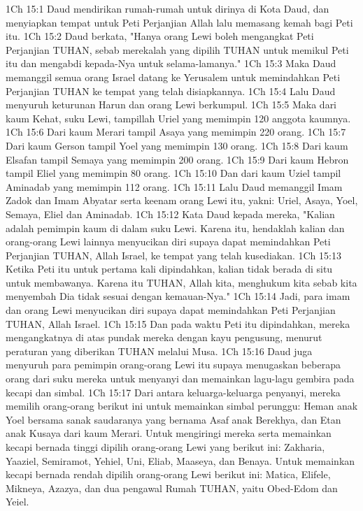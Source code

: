 1Ch 15:1  Daud mendirikan rumah-rumah untuk dirinya di Kota Daud, dan menyiapkan tempat untuk Peti Perjanjian Allah lalu memasang kemah bagi Peti itu.
1Ch 15:2  Daud berkata, "Hanya orang Lewi boleh mengangkat Peti Perjanjian TUHAN, sebab merekalah yang dipilih TUHAN untuk memikul Peti itu dan mengabdi kepada-Nya untuk selama-lamanya."
1Ch 15:3  Maka Daud memanggil semua orang Israel datang ke Yerusalem untuk memindahkan Peti Perjanjian TUHAN ke tempat yang telah disiapkannya.
1Ch 15:4  Lalu Daud menyuruh keturunan Harun dan orang Lewi berkumpul.
1Ch 15:5  Maka dari kaum Kehat, suku Lewi, tampillah Uriel yang memimpin 120 anggota kaumnya.
1Ch 15:6  Dari kaum Merari tampil Asaya yang memimpin 220 orang.
1Ch 15:7  Dari kaum Gerson tampil Yoel yang memimpin 130 orang.
1Ch 15:8  Dari kaum Elsafan tampil Semaya yang memimpin 200 orang.
1Ch 15:9  Dari kaum Hebron tampil Eliel yang memimpin 80 orang.
1Ch 15:10  Dan dari kaum Uziel tampil Aminadab yang memimpin 112 orang.
1Ch 15:11  Lalu Daud memanggil Imam Zadok dan Imam Abyatar serta keenam orang Lewi itu, yakni: Uriel, Asaya, Yoel, Semaya, Eliel dan Aminadab.
1Ch 15:12  Kata Daud kepada mereka, "Kalian adalah pemimpin kaum di dalam suku Lewi. Karena itu, hendaklah kalian dan orang-orang Lewi lainnya menyucikan diri supaya dapat memindahkan Peti Perjanjian TUHAN, Allah Israel, ke tempat yang telah kusediakan.
1Ch 15:13  Ketika Peti itu untuk pertama kali dipindahkan, kalian tidak berada di situ untuk membawanya. Karena itu TUHAN, Allah kita, menghukum kita sebab kita menyembah Dia tidak sesuai dengan kemauan-Nya."
1Ch 15:14  Jadi, para imam dan orang Lewi menyucikan diri supaya dapat memindahkan Peti Perjanjian TUHAN, Allah Israel.
1Ch 15:15  Dan pada waktu Peti itu dipindahkan, mereka mengangkatnya di atas pundak mereka dengan kayu pengusung, menurut peraturan yang diberikan TUHAN melalui Musa.
1Ch 15:16  Daud juga menyuruh para pemimpin orang-orang Lewi itu supaya menugaskan beberapa orang dari suku mereka untuk menyanyi dan memainkan lagu-lagu gembira pada kecapi dan simbal.
1Ch 15:17  Dari antara keluarga-keluarga penyanyi, mereka memilih orang-orang berikut ini untuk memainkan simbal perunggu: Heman anak Yoel bersama sanak saudaranya yang bernama Asaf anak Berekhya, dan Etan anak Kusaya dari kaum Merari. Untuk mengiringi mereka serta memainkan kecapi bernada tinggi dipilih orang-orang Lewi yang berikut ini: Zakharia, Yaaziel, Semiramot, Yehiel, Uni, Eliab, Maaseya, dan Benaya. Untuk memainkan kecapi bernada rendah dipilih orang-orang Lewi berikut ini: Matica, Elifele, Mikneya, Azazya, dan dua pengawal Rumah TUHAN, yaitu Obed-Edom dan Yeiel.
